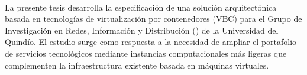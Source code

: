 \label{cap:resumen}
\mbox{}\\
La presente tesis desarrolla la especificación de una solución arquitectónica basada en tecnologías de virtualización por contenedores (VBC) para el Grupo de Investigación en Redes, Información y Distribución (\HTC) de la Universidad del Quindío. El estudio surge como respuesta a la necesidad de ampliar el portafolio de servicios tecnológicos mediante instancias computacionales más ligeras que complementen la infraestructura existente basada en máquinas virtuales.





\label{cap:abstract}
\mbox{}\\
 
